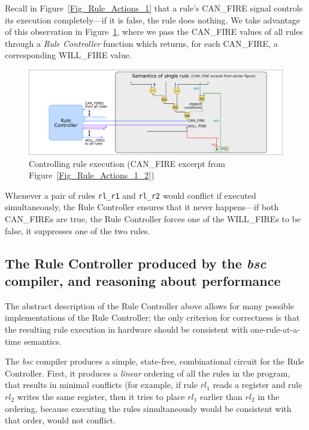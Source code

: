 Recall in Figure~\ref{Fig_Rule_Actions_1} that a rule's CAN\_FIRE
signal controls its execution completely---if it is false, the rule
does nothing.  We take advantage of this observation in
Figure~\ref{Fig_Rule_Actions_Controlled}, where we pass the CAN\_FIRE
values of all rules through a \emph{Rule Controller} function which
returns, for each CAN\_FIRE, a corresponding WILL\_FIRE value.
\begin{figure}[htbp]
  \centerline{\includegraphics[width=6in,angle=0]{Figures/Fig_Rule_Actions_Controlled}}
  \caption{\label{Fig_Rule_Actions_Controlled}
           Controlling rule execution
	   (CAN\_FIRE excerpt from Figure~\ref{Fig_Rule_Actions_1_2})}
\end{figure}

Whenever a pair of rules \verb|rl_r1| and \verb|rl_r2| would conflict
if executed simultaneously, the Rule Controller ensures that it never
happens---if both CAN\_FIREs are true, the Rule Controller forces one
of the WILL\_FIREs to be false, {\ie} it suppresses one of the two
rules.


\subsection{The Rule Controller produced by the \emph{bsc} compiler,
and reasoning about performance}

The abstract description of the Rule Controller above allows for many
possible implementations of the Rule Controller; the only criterion
for correctness is that the resulting rule execution in hardware
should be consistent with one-rule-at-a-time semantics.

The \emph{bsc} compiler produces a simple, state-free, combinational
circuit for the Rule Controller.  First, it produces a \emph{linear}
ordering of all the rules in the program, that results in minimal
conflicts (for example, if rule $rl_1$ reads a register and rule
$rl_2$ writes the same register, then it tries to place $rl_1$ earlier
than $rl_2$ in the ordering, because executing the rules
simultaneously would be consistent with that order, {\ie} would not
conflict.

